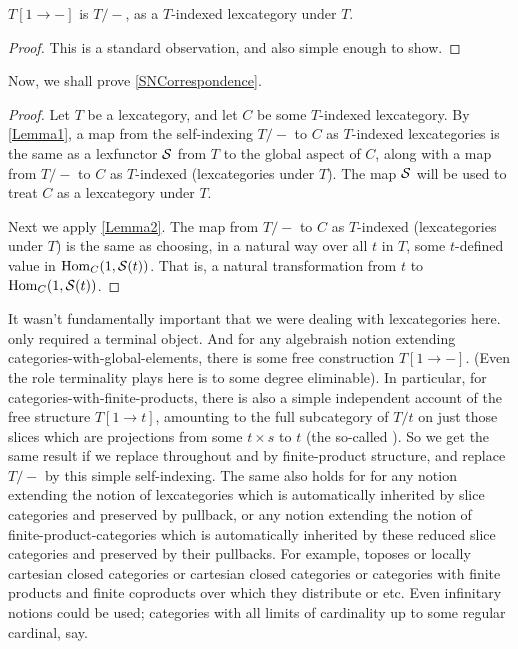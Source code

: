 \begin{lemma}\label{Lemma2}
$T[1 \to -]$ is $T/-$, as a $T$-indexed lexcategory under $T$.
\end{lemma}
\begin{proof}
This is a standard observation, and also simple enough to show. \TODO
\end{proof}

Now, we shall prove \cref{SNCorrespondence}.

\begin{proof}
Let $T$ be a lexcategory, and let $C$ be some $T$-indexed lexcategory. By \cref{Lemma1}, a map from the self-indexing $T/-$ to $C$ as $T$-indexed lexcategories is the same as a lexfunctor $\mathcal{S}$ from $T$ to the global aspect of $C$, along with a map from $T/-$ to $C$ as $T$-indexed (lexcategories under $T$). The map $\mathcal{S}$ will be used to treat $C$ as a lexcategory under $T$.

Next we apply \cref{Lemma2}. The map from $T/-$ to $C$ as $T$-indexed (lexcategories under $T$) is the same as choosing, in a natural way over all $t$ in $T$, some $t$-defined value in $\operatorname{Hom}_C(1, \mathcal{S}(t))$. That is, a natural transformation from $t$ to $\operatorname{Hom}_C(1, \mathcal{S}(t))$.
\end{proof}

\begin{remark}\label{IntrospGeneralDoctrine}
It wasn't fundamentally important that we were dealing with lexcategories here.  only required a terminal object. And for any algebraish notion extending categories-with-global-elements, there is some free construction $T[1 \to -]$. (Even the role terminality plays here is to some degree eliminable). In particular, for categories-with-finite-products, there is also a simple independent account of the free structure $T[1 \to t]$, amounting to the full subcategory of $T/t$ on just those slices which are projections from some $t \times s$ to $t$ (the so-called ). So we get the same result if we replace throughout  and  by finite-product structure, and replace $T/-$ by this simple self-indexing. The same also holds for for any notion extending the notion of lexcategories which is automatically inherited by slice categories and preserved by pullback, or any notion extending the notion of finite-product-categories which is automatically inherited by these reduced slice categories and preserved by their pullbacks. For example, toposes or locally cartesian closed categories or cartesian closed categories or categories with finite products and finite coproducts over which they distribute or etc. Even infinitary notions could be used; categories with all limits of cardinality up to some regular cardinal, say.
\end{remark}

